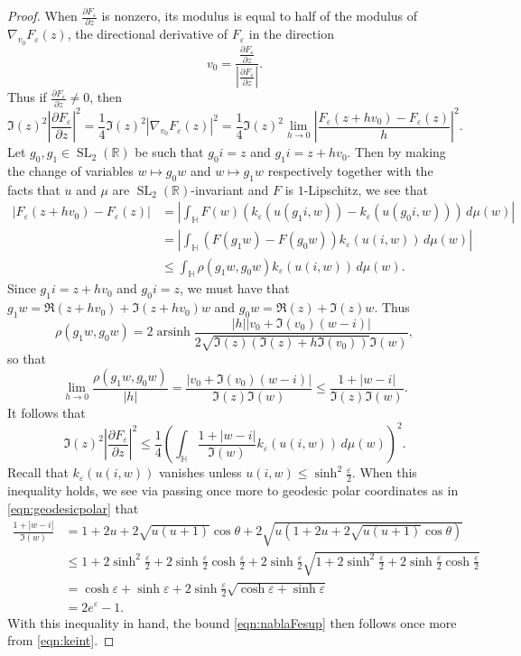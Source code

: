 \documentclass[11pt,a4paper]{amsart}
\newcommand{\dee}{\partial}
\newcommand{\e}{\varepsilon}
\newcommand{\Hb}{\mathbb{H}}
\newcommand{\R}{\mathbb{R}}
\DeclareMathOperator{\arsinh}{arsinh}
\DeclareMathOperator{\SL}{SL}
\numberwithin{equation}{section}
\theoremstyle{remark}
\theoremstyle{definition}
\begin{document}
\begin{proof}
When $\frac{\dee F_{\e}}{\dee z}$ is nonzero, its modulus is equal to half of the modulus of $\nabla_{v_0} F_{\e}(z)$, the directional derivative of $F_{\e}$ in the direction
\[v_0 = \frac{\frac{\dee F_{\e}}{\dee z}}{\left|\frac{\dee F_{\e}}{\dee z}\right|}.\]
Thus if $\frac{\dee F_{\e}}{\dee z} \neq 0$, then
\[\Im(z)^2 \left|\frac{\dee F_{\e}}{\dee z}\right|^2 = \frac{1}{4} \Im(z)^2 \left|\nabla_{v_0} F_{\e}(z)\right|^2 = \frac{1}{4} \Im(z)^2 \lim_{h \to 0} \left|\frac{F_{\e}(z + hv_0) - F_{\e}(z)}{h}\right|^2.\]
Let $g_0,g_1 \in \SL_2(\R)$ be such that $g_0 i = z$ and $g_1 i = z + hv_0$. Then by making the change of variables $w \mapsto g_0 w$ and $w \mapsto g_1 w$ respectively together with the facts that $u$ and $\mu$ are $\SL_2(\R)$-invariant and $F$ is $1$-Lipschitz, we see that
\begin{align*}
\left|F_{\e}(z + hv_0) - F_{\e}(z)\right| & = \left|\int_{\Hb} F(w) \left(k_{\e}(u(g_1 i,w)) - k_{\e}(u(g_0 i,w))\right) \, d\mu(w)\right|	\\
& = \left|\int_{\Hb} \left(F(g_1 w) - F(g_0 w)\right) k_{\e}(u(i,w)) \, d\mu(w)\right|	\\
& \leq \int_{\Hb} \rho(g_1 w,g_0 w) k_{\e}(u(i,w)) \, d\mu(w).
\end{align*}
Since $g_1 i = z + hv_0$ and $g_0 i = z$, we must have that $g_1 w = \Re(z + hv_0) + \Im(z + hv_0)w$ and $g_0 w = \Re(z) + \Im(z)w$. Thus
\[\rho(g_1 w,g_0 w) = 2 \arsinh \frac{|h| \left|v_0 + \Im(v_0) (w - i)\right|}{2\sqrt{\Im(z)(\Im(z) + h \Im(v_0))} \Im(w)},\]
so that
\[\lim_{h \to 0} \frac{\rho(g_1 w,g_0 w)}{|h|} = \frac{\left|v_0 + \Im(v_0) (w - i)\right|}{\Im(z) \Im(w)} \leq \frac{1 + |w - i|}{\Im(z) \Im(w)}.\]
It follows that
\[\Im(z)^2 \left|\frac{\dee F_{\e}}{\dee z}\right|^2 \leq \frac{1}{4} \left(\int_{\Hb} \frac{1 + |w - i|}{\Im(w)} k_{\e}(u(i,w)) \, d\mu(w)\right)^2.\]
Recall that $k_{\e}(u(i,w))$ vanishes unless $u(i,w) \leq \sinh^2 \frac{\e}{2}$. When this inequality holds, we see via passing once more to geodesic polar coordinates as in \eqref{eqn:geodesicpolar} that
\begin{align*}
\frac{1 + |w - i|}{\Im(w)} & = 1 + 2u + 2 \sqrt{u(u + 1)} \cos \theta + 2\sqrt{u \left(1 + 2u + 2\sqrt{u(u + 1)} \cos \theta\right)}	\\
& \leq 1 + 2 \sinh^2 \frac{\e}{2} + 2 \sinh \frac{\e}{2} \cosh \frac{\e}{2} + 2 \sinh \frac{\e}{2} \sqrt{1 + 2 \sinh^2 \frac{\e}{2} + 2 \sinh \frac{\e}{2} \cosh \frac{\e}{2}}	\\
& = \cosh \e + \sinh \e + 2 \sinh \frac{\e}{2} \sqrt{\cosh \e + \sinh \e}	\\
& = 2e^{\e} - 1.
\end{align*}
With this inequality in hand, the bound \eqref{eqn:nablaFesup} then follows once more from \eqref{eqn:keint}.
\end{proof}
\end{document}
